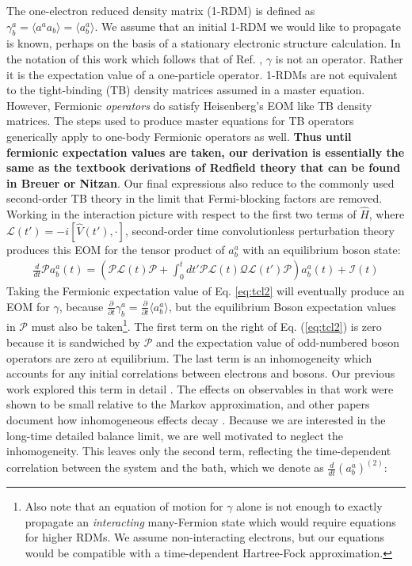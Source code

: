 \documentclass[aip,jcp,preprint,floatfix]{revtex4-1}
\begin{document}
{\indent 	The one-electron reduced density matrix (1-RDM) is defined as $\gamma^a_b = \langle a^{a}a_b \rangle= \langle a^a_b \rangle$. We assume that an initial 1-RDM we would like to propagate is known, perhaps on the basis of a stationary electronic structure calculation. In the notation of this work which follows that of Ref. \cite{Kutzelnigg:1997aa}, $\gamma$ is not an operator. Rather it is the expectation value of a one-particle operator. 1-RDMs are not equivalent to the tight-binding (TB) density matrices assumed in a master equation. However, Fermionic \emph{operators} do satisfy Heisenberg's EOM like TB density matrices. The steps used to produce master equations for TB operators generically apply to one-body Fermionic operators as well. \textbf{Thus until fermionic expectation values are taken, our derivation is essentially the same as the textbook derivations of Redfield theory that can be found in Breuer\cite{breuer_theory_2002} or Nitzan\cite{nitzan2006chemical}}. Our final expressions also reduce to the commonly used second-order TB theory in the limit that Fermi-blocking factors are removed.\\
\indent     Working in the interaction picture with respect to the first two terms of $\hat{H}$, where $\mathcal{L}(t') = -i[\hat{V}(t'),\cdot]$, second-order time convolutionless perturbation theory\cite{parkhill_correlated-polaron_2012,Shibata:1977tg, breuer_theory_2002} produces this EOM for the tensor product of $a^a_b$ with an equilibrium boson state: 
\begin{align}
\frac{d}{dt} \mathcal{P}a^a_b(t) =  \left( \mathcal{PL}(t)\mathcal{P} + \int_{0}^t dt'  \mathcal{PL}(t)\mathcal{Q}\mathcal{L}(t')\mathcal{P} \right ) a^a_b(t) + \mathcal{I}(t)
\label{eq:tcl2}
\end{align}
Taking the Fermionic expectation value of Eq. \ref{eq:tcl2} will eventually produce an EOM for $\gamma$, because $\frac{\partial}{\partial t}\gamma^a_b = \frac{\partial}{\partial t} \langle a^{a}_b \rangle $, but the equilibrium Boson expectation values in $\mathcal{P}$ must also be taken\footnote{Also note that an equation of motion for $\gamma$ alone is not enough to exactly propagate an \emph{interacting} many-Fermion state which would require equations for higher RDMs. We assume non-interacting electrons, but our equations would be compatible with a time-dependent Hartree-Fock approximation.}. The first term on the right of Eq. (\ref{eq:tcl2}) is zero because it is sandwiched by $\mathcal{P}$ and the expectation value of odd-numbered boson operators are zero at equilibrium. The last term is an inhomogeneity which accounts for any initial correlations between electrons and bosons. Our previous work explored this term in detail \cite{parkhill_correlated-polaron_2012}. The effects on observables in that work were shown to be small relative to the Markov approximation, and other papers document how inhomogeneous effects decay \cite{PhysRevA.86.062114,breuer_theory_2002}. Because we are interested in the long-time detailed balance limit, we are well motivated to neglect the inhomogeneity\cite{PhysRevA.88.052107}. This leaves only the second term, reflecting the time-dependent correlation between the system and the bath, which we denote as $\frac{d}{dt} (a^{a}_b)^{(2)}$:
}
\end{document}
